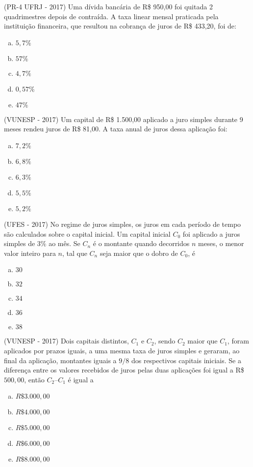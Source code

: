   \begin{exer}
  (PR-4 UFRJ - 2017) Uma dívida bancária de R\$ 950,00 foi quitada 2 quadrimestres depois de contraída. A taxa linear mensal praticada pela instituição financeira, que resultou na cobrança de juros de R\$ 433,20, foi de:
   \begin{enumerate}[a)]
  \item $5,7\%$
  \item $57\%$
  \item $4,7\%$
  \item $0,57\%$
  \item $47\%$
  \end{enumerate}
  \end{exer}

  \begin{exer}
  (VUNESP - 2017) Um capital de R\$ 1.500,00 aplicado a juro simples durante 9 meses rendeu juros de R\$ 81,00. A taxa anual de juros dessa aplicação foi:
  \begin{enumerate}[a)]
  \item $7,2\%$
  \item $6,8\%$
  \item $6,3\%$
  \item $5,5\%$
  \item $5,2\%$
  \end{enumerate}
  \end{exer}

  \begin{exer}
  (UFES - 2017) No regime de juros simples, os juros em cada período de tempo são calculados sobre o capital inicial. Um capital inicial $C_0$ foi aplicado a juros simples de $3\%$ ao mês. Se $C_n$ é o montante quando decorridos $n$ meses, o menor valor inteiro para $n$, tal que $C_n$ seja maior que o dobro de $C_0$, é
  \begin{enumerate}[a)]
  \item $30$
  \item $32$
  \item $34$
  \item $36$
  \item $38$
  \end{enumerate}
  \end{exer}

  \begin{exer}
  (VUNESP - 2017) Dois capitais distintos, $C_1$ e $C_2$, sendo $C_2$ maior que $C_1$, foram aplicados por prazos iguais, a uma mesma taxa de juros simples e geraram, ao final da aplicação, montantes iguais a $9/8$ dos respectivos capitais iniciais. Se a diferença entre os valores recebidos de juros pelas duas aplicações foi igual a R\$ $500,00$, então $C_2 – C_1$ é igual a
  \begin{enumerate}[a)]
  \item $R\$ 3.000,00$
  \item $R\$ 4.000,00$
  \item $R\$ 5.000,00$
  \item $R\$ 6.000,00$
  \item $R\$ 8.000,00$
  \end{enumerate}
  \end{exer}

